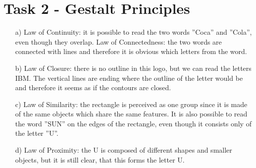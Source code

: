 \documentclass[a4paper]{article}
\begin{document}
\section*{Task 2 - Gestalt Principles}
\begin{enumerate}
	\item[a)]
	Law of Continuity: it is possible to read the two words ''Coca'' and ''Cola'', even though they overlap. 
	Law of Connectedness: the two words are connected with lines and therefore it is obvious which letters from the word. 
	\item[b)]
	Law of Closure: there is no outline in this logo, but we can read the letters IBM. The vertical lines are ending where the outline of the letter would be and therefore it seems as if the contours are closed.  
	\item[c)] 
	Law of Similarity: the rectangle is perceived as one group since it is made of the same objects which share the same features. 
	It is also possible to read the word ''SUN'' on the edges of the rectangle, even though it consists only of the letter ''U''.
	\item[d)] 
	Law of Proximity: the U is composed of different shapes and smaller objects, but it is still clear, that this forms the letter U. 
\end{enumerate}
\end{document}
